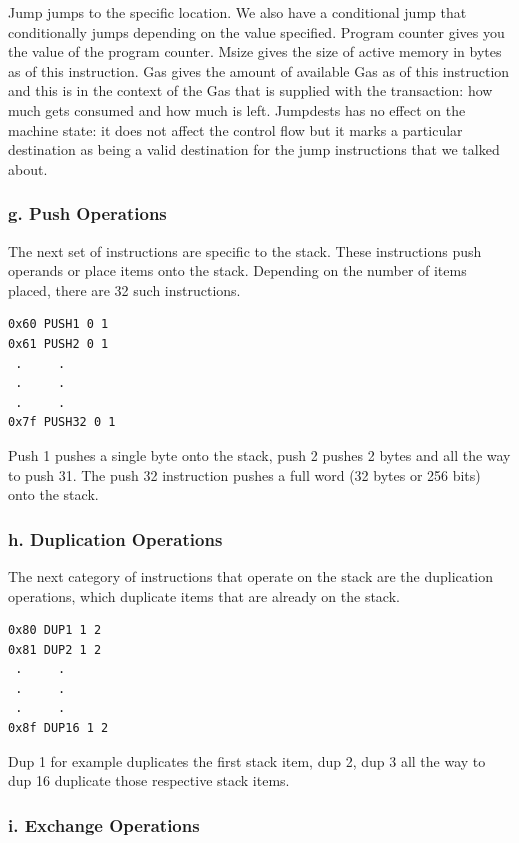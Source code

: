 Jump jumps to the specific location.
We also have a conditional jump that conditionally jumps depending on the value specified.
Program counter gives you the value of the program counter. 
Msize gives the size of active memory in bytes as of this instruction.
Gas gives the amount of available Gas as of this instruction and this is in the context of the Gas that is supplied with the transaction: how much gets consumed and how much is left.
Jumpdests has no effect on the machine state: it does not affect the control flow but it marks a particular destination as being a valid destination for the jump instructions that we talked about.

\subsubsection*{g. Push Operations}

The next set of instructions are specific to the stack. 
These instructions push operands or place items onto the stack.
Depending on the number of items placed, there are 32 such instructions.

\begin{lstlisting}[style=defaultStyle, caption={Push instructions.}]
0x60 PUSH1 0 1
0x61 PUSH2 0 1
 .     .
 .     .
 .     .
0x7f PUSH32 0 1
\end{lstlisting}

Push 1 pushes a single byte onto the stack, push 2 pushes 2 bytes and all the way to push 31.
The push 32 instruction pushes a full word (32 bytes or 256 bits) onto the stack.

\subsubsection*{h. Duplication Operations}

The next category of instructions that operate on the stack are the duplication operations, which duplicate items that are already on the stack.

\begin{lstlisting}[style=defaultStyle, caption={Duplicate instructions.}]
0x80 DUP1 1 2
0x81 DUP2 1 2
 .     .
 .     .
 .     .
0x8f DUP16 1 2
\end{lstlisting}

Dup 1 for example duplicates the first stack item, dup 2, dup 3 all the way to dup 16 duplicate those respective stack items.

\subsubsection*{i. Exchange Operations}

